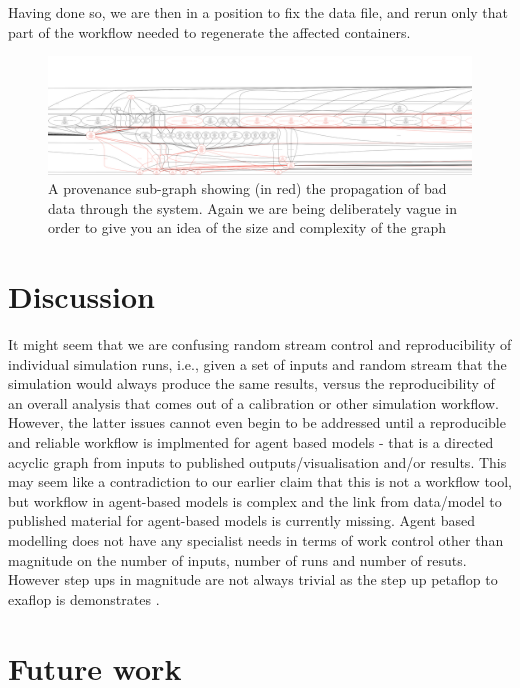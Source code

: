 \documentclass[runningheads]{llncs}
\begin{document}
\normalsize

Having done so, we are then in a position to fix the data file, and rerun only that part of the workflow needed to regenerate the affected containers.

\begin{figure} \includegraphics[width=\textwidth]{img/high-lit-provenance-trace.pdf}
\caption{A provenance sub-graph showing (in red) the propagation of bad data through the system. Again we are being deliberately vague in order to give you an idea of the size and complexity of the graph} \label{fig:high-lit-provenance-trace} \end{figure}

\section{Discussion}

It might seem that we are confusing random stream control and reproducibility
of individual simulation runs, i.e., given a set of inputs and random stream
that the simulation would always produce the same results, versus the
reproducibility of an overall analysis that comes out of a calibration or other
simulation workflow. However, the latter issues cannot even begin to be
addressed until a reproducible and reliable workflow is implmented for agent based models -
that is a directed acyclic graph from inputs to published outputs/visualisation
and/or results. This may seem like a contradiction to our earlier claim that
this is not a workflow tool, but workflow in agent-based models is complex and
the link from data/model to published material for agent-based models is
currently missing. Agent based modelling does not have any specialist needs in
terms of work control other than magnitude on the number of inputs, number of
runs and number of resuts. However step ups in magnitude are not always trivial
as the step up petaflop to exaflop is demonstrates
\cite{north2008agent}.



\section{Future work}
\end{document}
